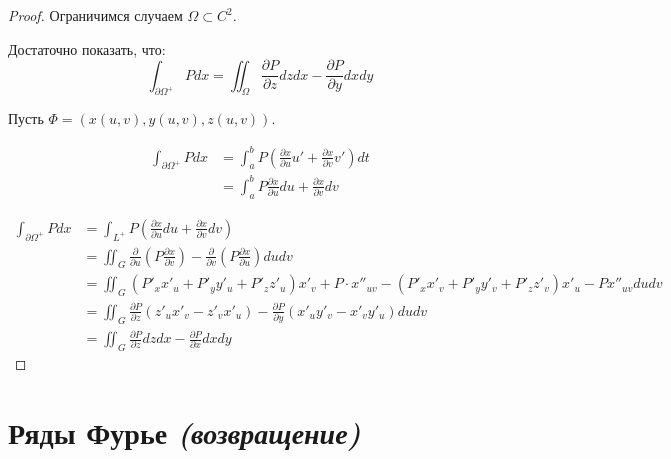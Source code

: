 \begin{proof}
    Ограничимся случаем \(\Omega \subset C^2\). %

    Достаточно показать, что:
    \[\int_{\partial \Omega^{ +}} P dx = \iint_\Omega \frac{\partial P}{\partial z} dz dx - \frac{\partial P}{\partial y} dx dy\]

    Пусть \(\Phi = (x(u, v), y(u, v), z(u, v))\).

    \begin{align*}
        \int_{\partial \Omega^{ +}} P dx & =\int_a^b P \left( \frac{\partial x}{\partial u} u' + \frac{\partial x}{\partial v} v' \right) dt \\
                                         & =\int_a^b P \frac{\partial x}{\partial u} du + \frac{\partial x}{\partial v} dv
    \end{align*}

    \begin{align*}
        \int_{\partial \Omega^{ +}} P dx & = \int_{L^{ +}} P \left( \frac{\partial x}{\partial u} du + \frac{\partial x}{\partial v} dv \right)                                                                    \\
                                         & = \iint_G \frac{\partial}{\partial u} \left( P \frac{\partial x}{\partial v} \right) - \frac{\partial}{\partial v} \left( P \frac{\partial x}{\partial u} \right) du dv \\
                                         & = \iint_G (P'_x x'_u + P'_y y'_u + P'_z z'_u)x'_v + P \cdot x''_{uv} - (P'_x x'_v + P'_y y'_v + P'_z z'_v) x'_u - P x''_{uv} du dv                                      \\
                                         & = \iint_G \frac{\partial P}{\partial z} (z'_u x'_v - z'_v x'_u) - \frac{\partial P}{\partial y} (x'_u y'_v - x'_v y'_u) du dv                                           \\
                                         & = \iint_G \frac{\partial P}{\partial z} dz dx - \frac{\partial P}{\partial x} dx dy
    \end{align*}
\end{proof}

\section{Ряды Фурье \textit{(возвращение)}}

